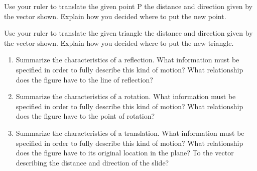 \documentclass{ximera}
\begin{document}
\begin{problem}
Use your ruler to translate the given point P the distance and direction given by the vector shown.  Explain how you decided where to put the new point.\\
\vskip 1.5in


\begin{center}
\end{center}
\vfill
\end{problem}
\newpage

\begin{problem}
Use your ruler to translate the given triangle the distance and direction given by the vector shown.  Explain how you decided where to put the new triangle.\\
\vskip 1.5in
\begin{center}
\end{center}
\vfill
\end{problem}
\newpage

\begin{problem}
\begin{enumerate}
    \item Summarize the characteristics of a reflection.  What information must be specified in order to fully describe this kind of motion?  What relationship does the figure have to the line of reflection?
    \item Summarize the characteristics of a rotation.  What information must be specified in order to fully describe this kind of motion?  What relationship does the figure have to the point of rotation?
    \item Summarize the characteristics of a translation.  What information must be specified in order to fully describe this kind of motion?  What relationship does the figure have to its original location in the plane? To the vector describing the distance and direction of the slide?
\end{enumerate}


\end{problem}
\end{document}

